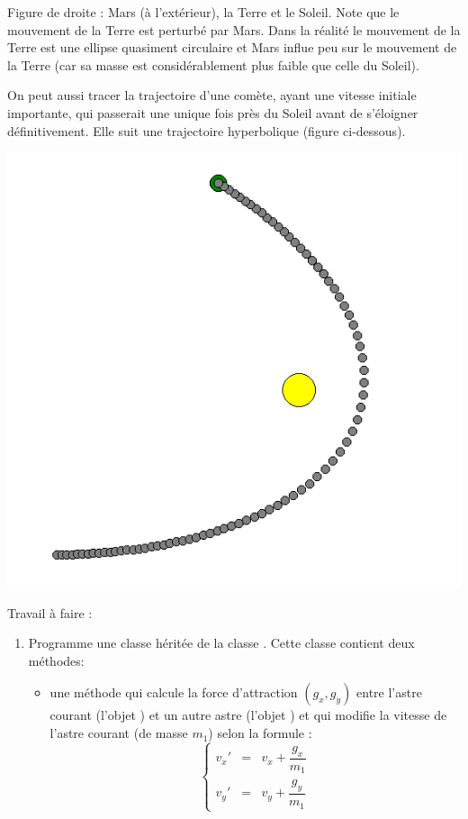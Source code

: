 \documentclass[11pt,class=report,crop=false]{standalone}
\begin{document}
\begin{activite}
Figure de droite : Mars (à l'extérieur), la Terre et le Soleil. Note que le mouvement de la Terre est perturbé par Mars.
Dans la réalité le mouvement de la Terre est une ellipse quasiment circulaire et Mars influe peu sur le mouvement de la Terre (car sa masse est considérablement plus faible que celle du Soleil).

On peut aussi tracer la trajectoire d'une comète, ayant une vitesse initiale importante, qui passerait une unique fois près du Soleil avant de s'éloigner définitivement. Elle suit une trajectoire hyperbolique (figure ci-dessous).
\begin{center}
\includegraphics[scale=\myscale,scale=0.3]{ecran-planetes-4}
\end{center}	

Travail à faire :
\begin{enumerate}
  \item Programme une classe  héritée de la classe .
  Cette classe contient deux méthodes: 
  \begin{itemize}
    \item une méthode  qui calcule la force d'attraction $(g_x,g_y)$ entre l'astre courant (l'objet ) et un autre astre (l'objet ) et qui modifie la vitesse de l'astre courant (de masse $m_1$) selon la formule :
  $$  \left\lbrace\begin{array}{rcl}
  v_x' &=& v_x + \dfrac{g_x}{m_1}\\[1em]
  v_y' &=& v_y + \dfrac{g_y}{m_1}
  \end{array}\right.$$  
  

\end{itemize}
\end{enumerate}
\end{activite}
\end{document}
